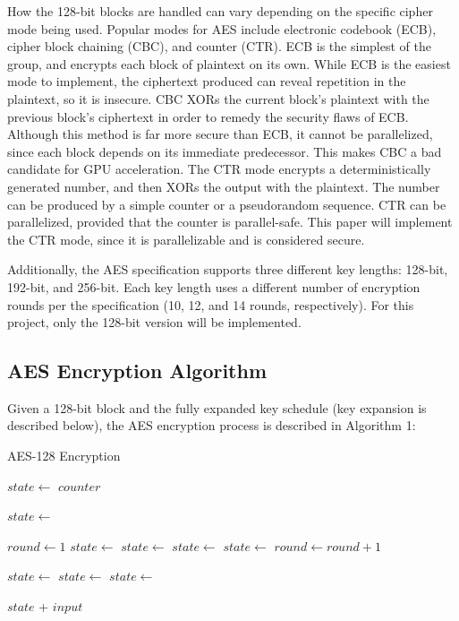 \documentclass[a4paper,10pt]{article}
\begin{document}
How the 128-bit blocks are handled can vary depending on the specific cipher mode being used.  Popular modes for AES include electronic codebook (ECB), cipher block chaining (CBC), and counter (CTR)\cite{intel}.  ECB is the simplest of the group, and encrypts each block of plaintext on its own.  While ECB is the easiest mode to implement, the ciphertext produced can reveal repetition in the plaintext, so it is insecure.  CBC XORs the current block's plaintext with the previous block's ciphertext in order to remedy the security flaws of ECB.  Although this method is far more secure than ECB, it cannot be parallelized, since each block depends on its immediate predecessor.  This makes CBC a bad candidate for GPU acceleration.  The CTR mode encrypts a deterministically generated number, and then XORs the output with the plaintext.  The number can be produced by a simple counter or a pseudorandom sequence.  CTR can be parallelized, provided that the counter is parallel-safe.    This paper will implement the CTR mode, since it is parallelizable and is considered secure\cite{schneier}.

Additionally, the AES specification supports three different key lengths: 128-bit, 192-bit, and 256-bit.  Each key length uses a different number of encryption rounds per the specification (10, 12, and 14 rounds, respectively).  For this project, only the 128-bit version will be implemented.

\subsection{AES Encryption Algorithm}

Given a 128-bit block and the fully expanded key schedule (key expansion is described below), the AES encryption process is described in Algorithm 1\cite{nist}:

\begin{algorithm}
\caption{AES-128 Encryption\cite{nist}}
\begin{algorithmic}[1]

\State $state\gets$ $counter$

\State $state\gets$ 

\State $round\gets 1$
    \State $state\gets$ 
    \State $state\gets$ 
    \State $state\gets$ 
    \State $state\gets$ 
    \State $round\gets round + 1$
\EndWhile

\State $state\gets$ 
\State $state\gets$ 
\State $state\gets$ 

\State \Return $state$ + $input$
\EndFunction
\end{algorithmic}
\end{algorithm}
\end{document}
